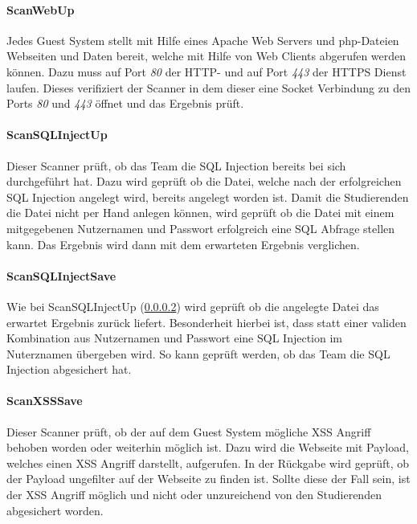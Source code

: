 \paragraph{ScanWebUp}\label{para:ScanWebUp}
Jedes Guest System stellt mit Hilfe eines Apache Web Servers und php-Dateien Webseiten und Daten bereit, welche mit Hilfe von Web Clients abgerufen werden können. Dazu muss auf Port \textit{80} der HTTP- und auf Port \textit{443} der HTTPS Dienst laufen. Dieses verifiziert der Scanner in dem dieser eine Socket Verbindung zu den Ports \textit{80} und \textit{443} öffnet und das Ergebnis prüft.

\paragraph{ScanSQLInjectUp}\label{para:ScanSQLInjectUp}
Dieser Scanner prüft, ob das Team die SQL Injection bereits bei sich durchgeführt hat. Dazu wird geprüft ob die Datei, welche nach der erfolgreichen SQL Injection angelegt wird, bereits angelegt worden ist. Damit die Studierenden die Datei nicht per Hand anlegen können, wird geprüft ob die Datei mit einem mitgegebenen Nutzernamen und Passwort erfolgreich eine SQL Abfrage stellen kann. Das Ergebnis wird dann mit dem erwarteten Ergebnis verglichen.

\paragraph{ScanSQLInjectSave}\label{para:ScanSQLInjectSave}
Wie bei ScanSQLInjectUp (\ref{para:ScanSQLInjectUp}) wird geprüft ob die angelegte Datei das erwartet Ergebnis zurück liefert. Besonderheit hierbei ist, dass statt einer validen Kombination aus Nutzernamen und Passwort eine SQL Injection im Nuterznamen übergeben wird. So kann geprüft werden, ob das Team die SQL Injection abgesichert hat.

\paragraph{ScanXSSSave}\label{para:ScanXSSSave}
Dieser Scanner prüft, ob der auf dem Guest System mögliche XSS Angriff behoben worden oder weiterhin möglich ist. Dazu wird die Webseite mit Payload, welches einen XSS Angriff darstellt, aufgerufen. In der Rückgabe wird geprüft, ob der Payload ungefilter auf der Webseite zu finden ist. Sollte diese der Fall sein, ist der XSS Angriff möglich und nicht oder unzureichend von den Studierenden abgesichert worden.

